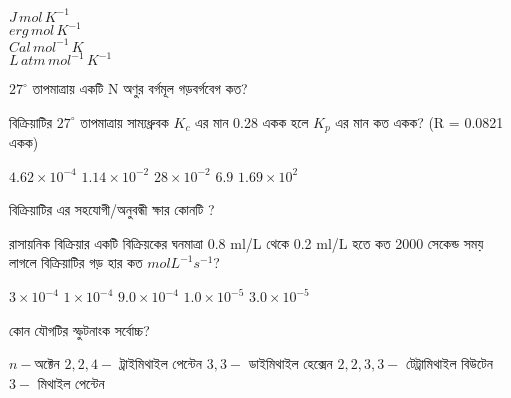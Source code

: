 \documentclass[addpoints]{exam}
\begin{document}
\begin{questions}
\begin{oneparchoices}
\choice $J\,mol\,K^{-1}$\\

\choice $erg\,mol\, K^{-1}$\\

\choice $Cal\,mol^{-1}\, K$\\

\choice $L\,atm\,mol^{-1}\,K^{-1}$
\end{oneparchoices}



\question $ 27^{\circ} $ তাপমাত্রায় একটি N অণুর বর্গমূল গড়বর্গবেগ কত?

\begin{oneparchoices}
\end{oneparchoices}

\question {}  বিক্রিয়াটির $ 27^{\circ} $ তাপমাত্রায় সাম্যধ্রুবক $ K_{c} $ এর মান 0.28 একক হলে $ K_{p} $ এর মান কত একক? (R = 0.0821 একক)

\begin{oneparchoices}
\choice $ 4.62\times 10^{-4} $
\choice $ 1.14\times 10^{-2} $
\choice $ 28\times 10^{-2} $
\choice $ 6.9 $
\choice $ 1.69\times 10^{2} $
\end{oneparchoices}

\question {}  বিক্রিয়াটির  এর সহযোগী/অনুবন্ধী ক্ষার কোনটি ?


\begin{oneparchoices}
\choice {}
\choice {}
\choice {}
\choice {}
\choice {}
\end{oneparchoices}

\question  রাসায়নিক বিক্রিয়ার একটি বিক্রিয়কের ঘনমাত্রা 0.8 ml/L  থেকে 0.2 ml/L হতে কত 2000 সেকেন্ড সময় লাগলে বিক্রিয়াটির গড় হার কত $molL^{-1}s^{-1}$?

\begin{oneparchoices}
\choice $ 3\times 10^{-4} $
\choice $ 1\times 10^{-4} $
\choice $ 9.0\times 10^{-4} $
\choice $ 1.0\times 10^{-5} $
\choice $ 3.0\times 10^{-5} $
\end{oneparchoices}

\question  কোন যৌগটির স্ফুটনাংক সর্বোচ্চ? 

\begin{oneparchoices}
\choice $ n- $অক্টেন 
\choice $ 2,2,4- $ ট্রাইমিথাইল পেন্টেন 
\choice $ 3,3- $ ডাইমিথাইল হেক্সেন 
\choice $ 2,2,3,3- $ টেট্রামিথাইল বিউটেন 
\choice$ 3- $ মিথাইল পেন্টেন
\end{oneparchoices}


\end{questions}
\end{document}
